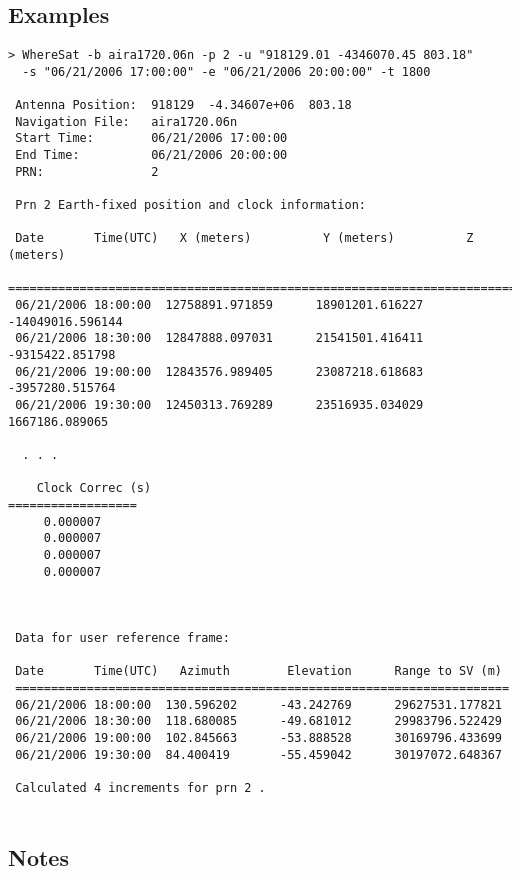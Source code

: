 \subsection{Examples}
\begin{\outputsize}
\begin{lstlisting}
> WhereSat -b aira1720.06n -p 2 -u "918129.01 -4346070.45 803.18"
  -s "06/21/2006 17:00:00" -e "06/21/2006 20:00:00" -t 1800

 Antenna Position:  918129  -4.34607e+06  803.18
 Navigation File:   aira1720.06n
 Start Time:        06/21/2006 17:00:00
 End Time:          06/21/2006 20:00:00
 PRN:               2

 Prn 2 Earth-fixed position and clock information:

 Date       Time(UTC)   X (meters)          Y (meters)          Z (meters)      
 ===============================================================================
 06/21/2006 18:00:00  12758891.971859      18901201.616227      -14049016.596144
 06/21/2006 18:30:00  12847888.097031      21541501.416411      -9315422.851798 
 06/21/2006 19:00:00  12843576.989405      23087218.618683      -3957280.515764 
 06/21/2006 19:30:00  12450313.769289      23516935.034029      1667186.089065  

  . . .

    Clock Correc (s)
==================
     0.000007
     0.000007
     0.000007
     0.000007

 

 Data for user reference frame:

 Date       Time(UTC)   Azimuth        Elevation      Range to SV (m)
 =====================================================================
 06/21/2006 18:00:00  130.596202      -43.242769      29627531.177821
 06/21/2006 18:30:00  118.680085      -49.681012      29983796.522429
 06/21/2006 19:00:00  102.845663      -53.888528      30169796.433699
 06/21/2006 19:30:00  84.400419       -55.459042      30197072.648367

 Calculated 4 increments for prn 2 .


\end{lstlisting}
\end{\outputsize}

\subsection{Notes}

%

